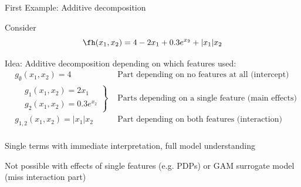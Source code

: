 \documentclass[10pt,compress,t,notes=noshow, xcolor=table]{beamer}
\begin{document}
\begin{framev}[align=top]{First Example: Additive decomposition}
\begin{example}
Consider
$$
\fh(x_1, x_2) = 4 - 2x_1 + 0.3 e^{x_2} + |x_1|x_2
$$

\begin{itemizeM}
\item Idea: Additive decomposition depending on which features used:
\pause
\begin{equation}\label{eq:func_decomp_first_min_example}
\begin{aligned}
& g_\emptyset(x_1, x_2) = 4 & \text{ Part depending on no features at all (intercept)}  \\
&
\left.\begin{aligned}
& g_1(x_1, x_2) = 2x_1 \\
& g_2(x_1, x_2) = 0.3 e^{x_2}
\end{aligned}\right\}
& \text{ Parts depending on a single feature (main effects)}  \\
& g_{1,2}(x_1, x_2) = |x_1|x_2 & \text{ Part depending on both features (interaction)}  \\
\end{aligned}
\end{equation}
\item[$\leadsto$] Single terms with immediate interpretation, full model understanding
\pause
\item[$\leftrightarrow$] Not possible with effects of single features (e.g. PDPs) or GAM surrogate model (miss interaction part)
        
        
\end{itemizeM}
\end{example}

\end{framev}
\end{document}
